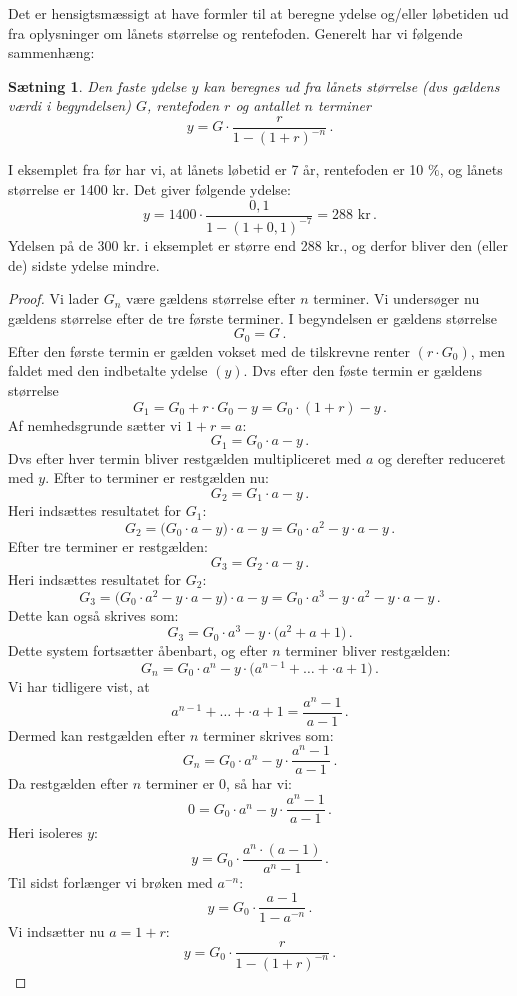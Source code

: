\documentclass[12pt,oneside,a4paper]{article}
\newtheorem{thm}{Sætning}[section]
\begin{document}
Det er hensigtsmæssigt at have formler til at beregne ydelse og/eller løbetiden
ud fra oplysninger om lånets størrelse og rentefoden.  Generelt har vi følgende
sammenhæng:

\begin{tcolorbox}
\begin{thm}
Den faste ydelse $y$ kan beregnes ud fra lånets størrelse (dvs gældens
værdi i begyndelsen) $G$, rentefoden $r$ og antallet $n$ terminer
\[
    y = G\cdot\frac{r}{1-(1+r)^{-n}}\,.
\]
\end{thm}
\end{tcolorbox}

I eksemplet fra før har vi, at lånets løbetid er 7 år, rentefoden er 10 $\%$, og
lånets størrelse er 1400 kr. Det giver følgende ydelse:
\[
y = 1400\cdot\frac{0,1}{1-(1+0,1)^{-7}} = 288 \,\,\mbox{kr}\,.
\]
Ydelsen på de 300 kr. i eksemplet er større end 288 kr., og derfor bliver den
(eller de) sidste ydelse mindre.

\begin{proof}
Vi lader $G_n$ være gældens størrelse efter $n$ terminer. Vi undersøger nu gældens størrelse
efter de tre første terminer.
I begyndelsen er gældens størrelse
\[
G_0 = G \,.
\]
Efter den første termin er gælden vokset med de tilskrevne renter $(r\cdot G_0)$, men faldet
med den indbetalte ydelse $(y)$.  Dvs efter den føste termin er gældens størrelse
\[
G_1 = G_0 + r\cdot G_0 - y = G_0\cdot (1+r) - y \,.
\]
Af nemhedsgrunde sætter vi $1+r = a$:
\[
G_1 = G_0\cdot a - y \,.
\]
Dvs efter hver termin bliver restgælden multipliceret med $a$ og derefter reduceret med $y$.
Efter to terminer er restgælden nu:
\[
G_2 = G_1 \cdot a - y \,.
\]
Heri indsættes resultatet for $G_1$:
\[
G_2 = \Big( G_0 \cdot a - y \Big) \cdot a - y = G_0 \cdot a^2 - y \cdot a - y \,.
\]
Efter tre terminer er restgælden:
\[
G_3 = G_2 \cdot a - y \,.
\]
Heri indsættes resultatet for $G_2$:
\[
G_3 = \Big( G_0 \cdot a^2 - y\cdot a - y \Big) \cdot a - y 
= G_0 \cdot a^3 - y \cdot a^2 - y \cdot a - y \,.
\]
Dette kan også skrives som:
\[
G_3 = G_0 \cdot a^3 - y \cdot \Big( a^2 + a + 1 \Big) \,.
\]
Dette system fortsætter åbenbart, og efter $n$ terminer bliver restgælden:
\[
G_n = G_0 \cdot a^n - y \cdot \Big( a^{n-1} + \ldots + \cdot a + 1 \Big) \,.
\]
Vi har tidligere vist, at
\[
a^{n-1} + \ldots + \cdot a + 1  = \frac{a^n - 1}{a-1} \,.
\]
Dermed kan restgælden efter $n$ terminer skrives som:
\[
G_n = G_0 \cdot a^n - y \cdot \frac{a^n - 1}{a-1} \,.
\]
Da restgælden efter $n$ terminer er $0$, så har vi:
\[
0 = G_0 \cdot a^n - y \cdot \frac{a^n - 1}{a-1} \,.
\]
Heri isoleres $y$:
\[
y = G_0 \cdot \frac{a^n \cdot (a-1)}{a^n - 1} \,.
\]
Til sidst forlænger vi brøken med $a^{-n}$:
\[
y = G_0 \cdot \frac{a-1}{1 - a^{-n}} \,.
\]
Vi indsætter nu $a = 1+r$:
\[
    y = G_0 \cdot \frac{r}{1 - (1+r)^{-n}} \,.
\]

\end{proof}
\end{document}
